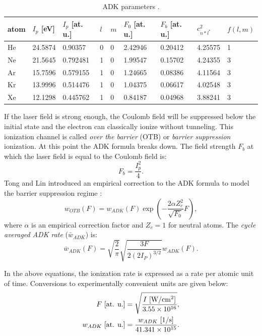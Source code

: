 \begin{table}[]
	\centering
	\begin{tabular}{l|l|l|l|l|l|l|l|l}
		atom & $I_p$ {[}eV{]} & $I_p$ {[}at. u.{]} & $l$ & $m$ & $F_0$ {[}at. u.{]} & $F_b$ {[}at. u.{]} & $c_{n*l^*}^2$ & $f(l,m)$ \\ \hline
		He & 24.5874 & 0.90357 & 0 & 0 & 2.42946 & 0.20412 & 4.25575 & 1 \\
		Ne & 21.5645 & 0.792481 & 1 & 0 & 1.99547 & 0.15702 & 4.24355 & 3 \\
		Ar & 15.7596 & 0.579155 & 1 & 0 & 1.24665 & 0.08386 & 4.11564 & 3 \\
		Kr & 13.9996 & 0.514476 & 1 & 0 & 1.04375 & 0.06617 & 4.02548 & 3 \\
		Xe & 12.1298 & 0.445762 & 1 & 0 & 0.84187 & 0.04968 & 3.88241 & 3
	\end{tabular}
	\caption{ADK parameters \cite{changAttosecondOpticsTechnology2016}.}
	\label{tab:ADK-params}
\end{table}

If the laser field is strong enough, the Coulomb field will be suppressed below the initial state and the electron can classically ionize without tunneling. This ionization channel is called \textit{over the barrier} (OTB) or \textit{barrier suppression} ionization. At this point the ADK formula breaks down. The field strength $F_b$ at which the laser field is equal to the Coulomb field is:
\begin{equation}
F_b = \frac{I_p^2}{4}.
\end{equation}
Tong and Lin introduced an empirical correction to the ADK formula to model the barrier suppression regime \cite{tongEmpiricalFormulaStatic2005}:
\begin{equation}
w_{OTB} (F) = w_{ADK} (F) \exp \left( - \frac{2 \alpha Z_c^2}{\sqrt{F_0}} F \right),
\label{eqn:ADK-TL}
\end{equation}
where $\alpha$ is an empirical correction factor and $Z_c=1$ for neutral atoms. The \textit{cycle averaged ADK rate} ($\bar{w}_{ADK}$) is:
\begin{equation}
\bar{w}_{ADK} (F) = \sqrt{\frac{2}{\pi}} \sqrt{\frac{3 F}{2 (2 I_P)^{3/2}}} w_{ADK} (F).
\end{equation}

In the above equations, the ionization rate is expressed as a rate per atomic unit of time. Conversions to experimentally convenient units are given below:
\begin{align}
\begin{split}
F \textrm{ [at. u.]} &= \sqrt{\frac{ I \textrm{ [W/cm\textsuperscript{2}]}}{3.55 \times 10^{16}}}, \\
w_{ADK} \textrm{  [at. u.]} &= \frac{w_{ADK} \textrm{ [1/s]}}{41.341 \times 10^{15}}.
\end{split}
\end{align}

